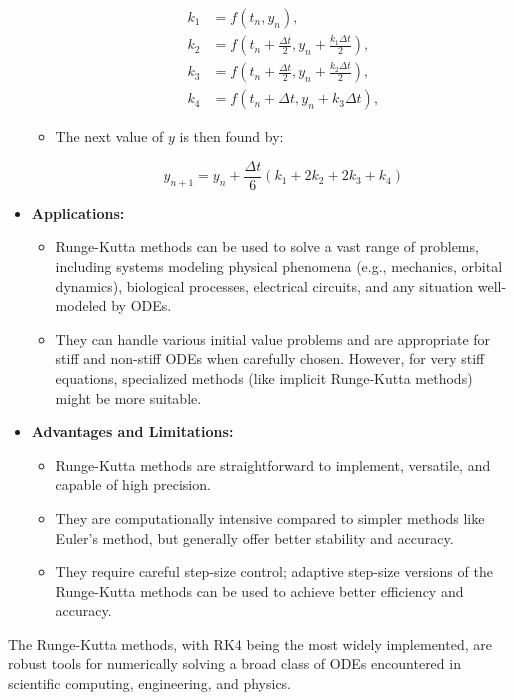 \begin{airesult}
\begin{itemize}
\begin{itemize}
  \[
  \begin{aligned}
  k_1 &= f(t_n, y_n), \\
  k_2 &= f\left(t_n + \frac{\Delta t}{2}, y_n + \frac{k_1 \Delta t}{2}\right), \\
  k_3 &= f\left(t_n + \frac{\Delta t}{2}, y_n + \frac{k_2 \Delta t}{2}\right), \\
  k_4 &= f(t_n + \Delta t, y_n + k_3 \Delta t),
  \end{aligned}
  \]

  \item The next value of \( y \) is then found by:

  \[
  y_{n+1} = y_n + \frac{\Delta t}{6} (k_1 + 2k_2 + 2k_3 + k_4)
  \]

  \end{itemize}

\item \textbf{Applications:}

  \begin{itemize}
  \item Runge-Kutta methods can be used to solve a vast range of problems, including systems
modeling physical phenomena (e.g., mechanics, orbital dynamics), biological processes, electrical
circuits, and any situation well-modeled by ODEs.
  \item They can handle various initial value problems and are appropriate for stiff and non-stiff
ODEs when carefully chosen. However, for very stiff equations, specialized methods (like implicit
Runge-Kutta methods) might be more suitable.
  \end{itemize}

\item \textbf{Advantages and Limitations:}

  \begin{itemize}
  \item Runge-Kutta methods are straightforward to implement, versatile, and capable of high
precision.
  \item They are computationally intensive compared to simpler methods like Euler's method, but
generally offer better stability and accuracy.
  \item They require careful step-size control; adaptive step-size versions of the Runge-Kutta
methods can be used to achieve better efficiency and accuracy.
  \end{itemize}

\end{itemize}

\vsp

The Runge-Kutta methods, with RK4 being the most widely implemented, are robust tools for
numerically solving a broad class of ODEs encountered in scientific computing, engineering, and
physics.
\end{airesult}


